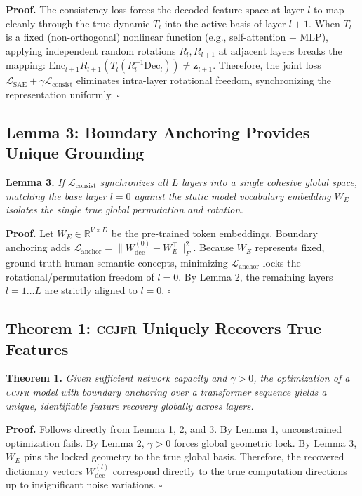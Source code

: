 \documentclass[12pt,a4paper]{article}
\newcommand{\CCJFR}{\textsc{ccjfr}}
\begin{document}
\textbf{Proof.} The consistency loss forces the decoded feature space at layer $l$ to map cleanly through the true dynamic $T_l$ into the active basis of layer $l+1$. When $T_l$ is a fixed (non-orthogonal) nonlinear function (e.g., self-attention + MLP), applying independent random rotations $R_l, R_{l+1}$ at adjacent layers breaks the mapping: $\mathrm{Enc}_{l+1} R_{l+1} (T_l(R_l^{-1} \mathrm{Dec}_l)) \neq \mathbf{z}_{l+1}$.
Therefore, the joint loss $\mathcal{L}_{\mathrm{SAE}} + \gamma \mathcal{L}_{\mathrm{consist}}$ eliminates intra-layer rotational freedom, synchronizing the representation uniformly. $\square$

\subsection{Lemma 3: Boundary Anchoring Provides Unique Grounding}

\textbf{Lemma 3.} \textit{If $\mathcal{L}_{\mathrm{consist}}$ synchronizes all $L$ layers into a single cohesive global space, matching the base layer $l=0$ against the static model vocabulary embedding $W_E$ isolates the single true global permutation and rotation.}

\textbf{Proof.} Let $W_E \in \mathbb{R}^{V \times D}$ be the pre-trained token embeddings. 
Boundary anchoring adds $\mathcal{L}_{\mathrm{anchor}} = \|W_{\mathrm{dec}}^{(0)} - W_E^\top\|_F^2$.
Because $W_E$ represents fixed, ground-truth human semantic concepts, minimizing $\mathcal{L}_{\mathrm{anchor}}$ locks the rotational/permutation freedom of $l=0$. By Lemma 2, the remaining layers $l=1 \dots L$ are strictly aligned to $l=0$. $\square$

\subsection{Theorem 1: \CCJFR{} Uniquely Recovers True Features}

\textbf{Theorem 1.} \textit{Given sufficient network capacity and $\gamma > 0$, the optimization of a \CCJFR{} model with boundary anchoring over a transformer sequence yields a unique, identifiable feature recovery globally across layers.}

\textbf{Proof.} Follows directly from Lemma 1, 2, and 3. By Lemma 1, unconstrained optimization fails. By Lemma 2, $\gamma > 0$ forces global geometric lock. By Lemma 3, $W_E$ pins the locked geometry to the true global basis. Therefore, the recovered dictionary vectors $W_{\mathrm{dec}}^{(l)}$ correspond directly to the true computation directions up to insignificant noise variations. $\square$
\end{document}
